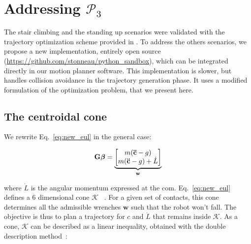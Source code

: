 \section{Addressing $\mathcal{P}_3$}
\label{app:optim}
The stair climbing and the standing up scenarios were validated with the trajectory optimization scheme provided in \citeauthor{Carpentier2016}. 
To address the others scenarios, we propose a new implementation, entirely open source (\url{https://github.com/stonneau/python_sandbox}), which can be integrated directly in our motion planner software.
This implementation is slower, but handles collision avoidance in the trajectory generation phase.
It uses a modified formulation of the optimization problem, that we present here.

\subsection{The centroidal cone}
We rewrite Eq.~\ref{eq:new_eul} in the general case:


\begin{align} \label{eq:new_eul_acc}
\mathbf{G} \bm{\beta} = 
\underbrace{\begin{bmatrix}m (\mathbf{\ddot{c}} - {g}) \\m (\mathbf{\ddot{c}} - {g}) + \dot{L}\end{bmatrix}}_{\mathbf{w}}
\end{align}

where $\dot{L}$ is the angular momentum expressed at the com.
Eq.~\ref{eq:new_eul} defines a 6 dimensional cone $\mathcal{K}$ ~\citep{qiu:dhm:2011,Caron2015}. For a given set of contacts,
this cone determines all the admissible wrenches $\mathbf{w}$ such that the robot won't fall. The objective 
is thus to plan a trajectory for $c$ and $\dot{L}$ that remains inside $\mathcal{K}$. As a cone,
$\mathcal{K}$ can be described as a linear inequality, obtained with the double description method~\citep{Fukuda1996}:

